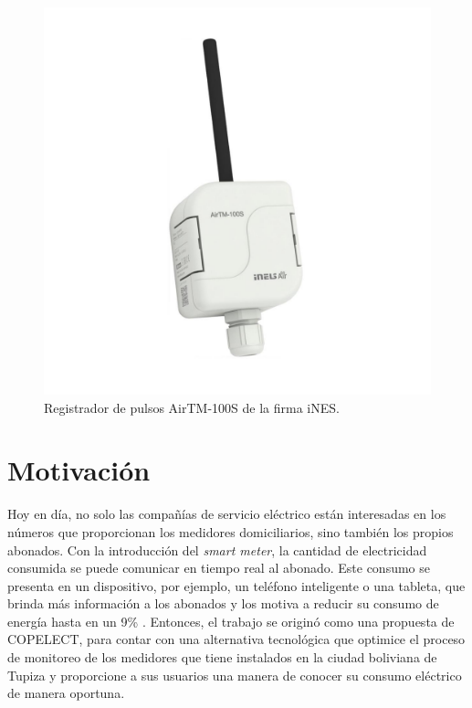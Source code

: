\begin{itemize}
	\begin{figure}[h]
		\centering
		\includegraphics[scale=0.4]{./Figures/airtm-100s.pdf}
		\caption{Registrador de pulsos AirTM-100S de la firma iNES\protect\footnotemark.}
		\label{fig:cuadradoAzul}
	\end{figure}	
\end{itemize}



\section{Motivación}

Hoy en día, no solo las compañías de servicio eléctrico están interesadas en los números que proporcionan los medidores domiciliarios, sino también los propios abonados. Con la introducción del \textit{smart meter}, la cantidad de electricidad consumida se puede comunicar en tiempo real al abonado. Este consumo se presenta en un dispositivo, por ejemplo, un teléfono inteligente o una tableta, que brinda más información a los abonados y los motiva a reducir su consumo de energía hasta en un 9\% \citep{WEBSITE:8}. Entonces, el trabajo se originó como una propuesta de COPELECT, para contar con una alternativa tecnológica que optimice el proceso de monitoreo de los medidores que tiene instalados en la ciudad boliviana de Tupiza y proporcione a sus usuarios una manera de conocer su consumo eléctrico de manera oportuna.

